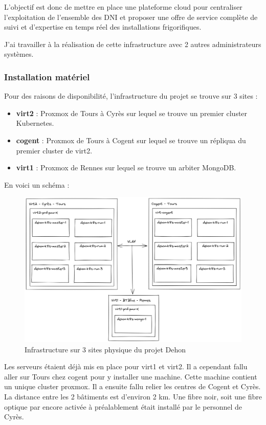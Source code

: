 \documentclass[12pt]{article}
\begin{document}
L'objectif est donc de mettre en place une plateforme cloud pour centraliser l'exploitation de l'ensemble des DNI et proposer une offre de service complète de suivi et d'expertise en temps réel des installations frigorifiques.

J'ai travailler à la réalisation de cette infrastructure avec 2 autres administrateurs systèmes.

\subsubsection{Installation matériel}
Pour des raisons de disponibilité, l'infrastructure du projet se trouve sur 3 sites :
\begin{itemize}
    \item \textbf{virt2} : Proxmox de Tours à Cyrès sur lequel se trouve un premier cluster Kubernetes.
    \item \textbf{cogent} : Proxmox de Tours à Cogent sur lequel se trouve un répliqua du premier cluster de virt2.
    \item \textbf{virt1} : Proxmox de Rennes sur lequel se trouve un arbiter MongoDB. 
\end{itemize}

\newpage
En voici un schéma :
\begin{figure}
    \centering
        \includegraphics[width=\textwidth]{src/Dehon1.png}
    \caption{Infrastructure sur 3 sites physique du projet Dehon}
    \label{fig:dehon1}
\end{figure}

Les serveurs étaient déjà mis en place pour virt1 et virt2. 
Il a cependant fallu aller sur Tours chez cogent pour y installer une machine. 
Cette machine contient un unique cluster proxmox. 
Il a ensuite fallu relier les centres de Cogent et Cyrès. 
La distance entre les 2 bâtiments est d'environ 2 km. Une fibre noir, soit une fibre optique par encore activée à préalablement était installé par le personnel de Cyrès.
\end{document}
